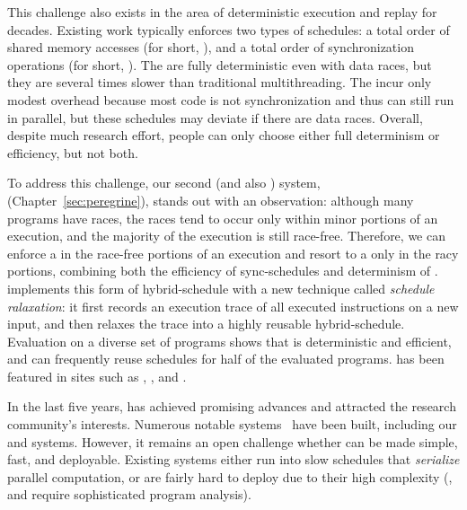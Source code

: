  This challenge also exists in the area of deterministic
execution and replay for decades. Existing work typically enforces two types of
schedules: a total order of shared memory accesses (for short, \memsched), and a
total order of synchronization operations (for short, \syncsched). The
\memscheds are fully deterministic even with data races, but they are several
times slower than traditional multithreading. The \syncscheds incur only modest
overhead because most code is not synchronization and thus can still run in
parallel, but these schedules may deviate if there are data races. Overall,
despite much research effort, people can only choose either full determinism or
efficiency, but not both.

To address this challenge, our second \smt (and also \dmt) system,
\peregrine~\cite{peregrine:sosp11} (Chapter~\ref{sec:peregrine}), stands out
with an observation: although many programs have races, the races tend to occur
only within minor portions of an execution, and the majority of the execution is
still race-free. Therefore, we can enforce a \syncscheds in the race-free
portions of an execution and resort to a \memsched only in the racy portions,
combining both the efficiency of sync-schedules and determinism of \memscheds. 
\peregrine implements this form of hybrid-schedule with a new technique called
\emph{schedule ralaxation}: it first records an execution trace of
all executed instructions on a new input, and then relaxes the trace into a
highly reusable hybrid-schedule. Evaluation on a diverse set of programs shows
that \peregrine is deterministic and efficient, and can frequently reuse
schedules for half of the evaluated programs. \peregrine has been featured in
sites such as \acmtechnews, \tgdaily, and \physorg.

 In the last
five years, \smt has achieved promising advances and attracted the research
community's interests. Numerous notable \smt systems~\cite{determinator:osdi10,
cui:tern:osdi10, peregrine:sosp11, dthreads:sosp11, bergan:oopsla13} have been
built, including our \tern and \peregrine systems. However, it remains an open
challenge whether \smt can be made simple, fast, and deployable. Existing \smt
systems either run into slow schedules that \emph{serialize} parallel
computation, or are fairly hard to deploy due to their high complexity (\eg,
\tern and \peregrine require sophisticated program analysis).

